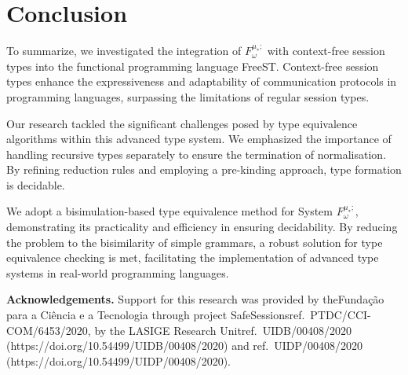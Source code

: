\section{Conclusion}\label{sec:conclusion}
To summarize, we investigated the integration of  $F^{\mu_*;}_\omega$ with context-free session types into the functional programming language FreeST. Context-free session types enhance the expressiveness and adaptability of communication protocols in programming languages, surpassing the limitations of regular session types. 

Our research tackled the significant challenges posed by type equivalence algorithms within this advanced type system. We emphasized the importance of handling recursive types separately to ensure the termination of normalisation. By refining reduction rules and employing a pre-kinding approach, type formation is decidable.

We adopt a bisimulation-based type equivalence method for System $F^{\mu_*;}_\omega$, demonstrating its practicality and efficiency in ensuring decidability. By reducing the problem to the bisimilarity of simple grammars, a robust solution for type equivalence checking is met, facilitating the implementation of advanced type systems in real-world programming languages.
\medskip

\noindent \textbf{Acknowledgements.} Support for this research was provided by the\linebreak Fundação para a Ciência e a Tecnologia through project SafeSessions\linebreak ref.\ PTDC/CCI-COM/6453/2020, by the LASIGE Research Unit\linebreak ref.\ UIDB/00408/2020 (https://doi.org/10.54499/UIDB/00408/2020) and ref.\ UIDP/00408/2020 (https://doi.org/10.54499/UIDP/00408/2020).
